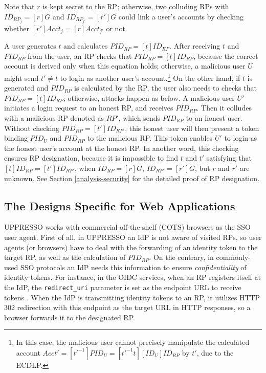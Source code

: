 Note that $r$ is kept secret to the RP; otherwise, two colluding RPs with $ID_{RP_j} = [r]G$ and $ID_{RP_{j'}} = [r']G$ could link a user's accounts by checking whether $[r']Acct_j = [r]Acct_{j'}$ or not.

A user generates $t$ and calculates $PID_{RP} = [t]ID_{RP}$.
After receiving $t$ and $PID_{RP}$ from the user,
    an RP checks that $PID_{RP} = [t]ID_{RP}$,
        because the correct account is derived only when this equation holds;
        otherwise, a malicious user $U$ might send $t' \neq t$ to login as another user's account.\footnote{In this case, the malicious user cannot precisely manipulate the calculated account $Acct' =  [t'^{-1}]PID_{U} = [t'^{-1}t][ID_U]ID_{RP}$ by $t'$,
        due to the ECDLP.}
On the other hand,
    if $t$ is generated and $PID_{RP}$ is calculated by the RP,
the user also needs to checks that $PID_{RP} = [t]ID_{RP}$;
    otherwise, attacks happen as below.
A malicious user $U'$ initiates a login request to an honest RP,
    and receives $PID_{RP}$.
Then it colludes with a malicious RP denoted as $RP'$,
    which sends $PID_{RP}$ to an honest user.
Without checking $PID_{RP} = [t']ID_{RP'}$,
    this honest user will then present a token binding $PID_U$ and $PID_{RP}$ to the malicious RP.
This token enables $U'$ to login as the honest user's account at the honest RP.
In another word, this checking ensures RP designation,
    because it is impossible to find $t$ and $t'$ satisfying that
    $[t]ID_{RP} = [t']ID_{RP'}$,
        when $ID_{RP} = [r]G$, $ID_{RP'} = [r']G$, but $r$ and $r'$ are unknown.
See Section \ref{analysis-security} for the detailed proof of RP designation.

\subsection{The Designs Specific for Web Applications}
\label{sec:web-design}
UPPRESSO works with commercial-off-the-shelf (COTS) browsers as the SSO user agent.
First of all, in UPPRESSO an IdP is not aware of visited RPs,
 so user agents (or browsers) have to deal with the forwarding of an identity token
    to the target RP, as well as the calculation of $PID_{RP}$.
On the contrary,
    in commonly-used SSO protocols \cite{OpenIDConnect,rfc6749,SAML,SAMLIdentifier} an IdP needs this information to ensure \emph{confidentiality} of identity tokens.
For instance, in the OIDC services, when an RP registers itself at the IdP, the \verb+redirect_uri+ parameter
    is set as the endpoint URL to receive tokens  \cite{OpenIDConnect}.
When the IdP is transmitting identity tokens to an RP,
    it utilizes HTTP 302 redirection with this endpoint as the target URL in HTTP responses,
     so a browser forwards it to the designated RP.

